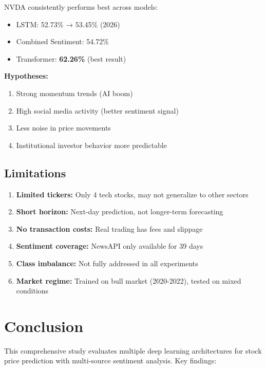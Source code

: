 \documentclass[10pt,twocolumn]{article}
\begin{document}
NVDA consistently performs best across models:
\begin{itemize}
\item LSTM: 52.73\% → 53.45\% (2026)
\item Combined Sentiment: 54.72\%
\item Transformer: \textbf{62.26\%} (best result)
\end{itemize}

\textbf{Hypotheses:}
\begin{enumerate}
\item Strong momentum trends (AI boom)
\item High social media activity (better sentiment signal)
\item Less noise in price movements
\item Institutional investor behavior more predictable
\end{enumerate}

\subsection{Limitations}

\begin{enumerate}
\item \textbf{Limited tickers:} Only 4 tech stocks, may not generalize to other sectors
\item \textbf{Short horizon:} Next-day prediction, not longer-term forecasting
\item \textbf{No transaction costs:} Real trading has fees and slippage
\item \textbf{Sentiment coverage:} NewsAPI only available for 39 days
\item \textbf{Class imbalance:} Not fully addressed in all experiments
\item \textbf{Market regime:} Trained on bull market (2020-2022), tested on mixed conditions
\end{enumerate}

\section{Conclusion}

This comprehensive study evaluates multiple deep learning architectures for stock price prediction with multi-source sentiment analysis. Key findings:
\end{document}
